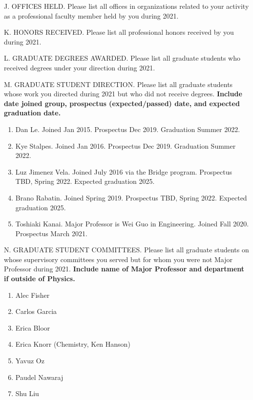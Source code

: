 \noindent J. OFFICES HELD. Please list all offices in organizations
related to your activity as a professional faculty member held by
you during 2021.
\bigskip

\noindent K. HONORS RECEIVED. Please list all professional honors
received by you during 2021.
\bigskip

\noindent L. GRADUATE DEGREES AWARDED. Please list all graduate
students who received degrees under your direction during 2021.
\bigskip

\noindent M. GRADUATE STUDENT DIRECTION. Please list all graduate
students whose work you directed during 2021 but who did not receive
degrees. {\bf Include date joined group, prospectus (expected/passed) date, 
and expected graduation date.}
\bigskip

\begin{enumerate}
    \item Dan Le.  Joined Jan 2015.  Prospectus Dec 2019.   Graduation Summer
        2022.
    \item Kye Stalpes.  Joined Jan 2016.  Prospectus Dec 2019.  Graduation
        Summer 2022.
    \item Luz Jimenez Vela.  Joined July 2016 via the Bridge program.
        Prospectus TBD, Spring 2022.  Expected graduation 2025.
    \item Brano Rabatin.  Joined Spring 2019.  Prospectus TBD, Spring 2022.
        Expected graduation 2025.
    \item Toshiaki Kanai.  Major Professor is Wei Guo in Engineering.  Joined
        Fall 2020.  Prospectus March 2021.  
\end{enumerate}

\noindent N. GRADUATE STUDENT COMMITTEES. Please list all graduate
students on whose supervisory committees you served but for whom you
were not Major Professor during 2021. {\bf Include name of Major Professor 
and department if outside of Physics. }
\bigskip

\begin{enumerate}
    \item Alec Fisher
    \item Carlos Garcia 
    \item Erica Bloor
    \item Erica Knorr (Chemistry, Ken Hanson)
    \item Yavuz Oz
    \item Paudel Nawaraj
    \item Shu Liu
\end{enumerate}

